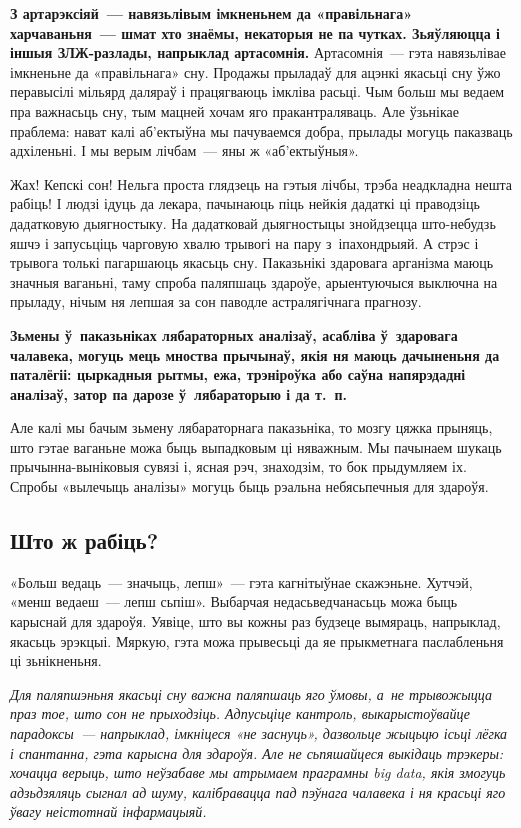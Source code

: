\textbf{З артарэксіяй~--- навязьлівым імкненьнем да «правільнага» харчаваньня~--- шмат хто знаёмы, некаторыя не па чутках. Зьяўляюцца і іншыя ЗЛЖ-разлады, напрыклад артасомнія.} Артасомнія~--- гэта навязьлівае імкненьне да «правільнага» сну. Продажы прыладаў для ацэнкі якасьці сну ўжо перавысілі мільярд даляраў і працягваюць імкліва расьці. Чым больш мы ведаем пра важнасьць сну, тым мацней хочам яго пракантраляваць. Але ўзьнікае праблема: нават калі аб'ектыўна мы пачуваемся добра, прылады могуць паказваць адхіленьні. І мы верым лічбам~--- яны ж «аб'ектыўныя».

Жах! Кепскі сон! Нельга проста глядзець на гэтыя лічбы, трэба неадкладна нешта рабіць! І людзі ідуць да лекара, пачынаюць піць нейкія дадаткі ці праводзіць дадатковую дыягностыку. На дадатковай дыягностыцы знойдзецца што-небудзь яшчэ і запусьціць чарговую хвалю трывогі на пару з~іпахондрыяй. А стрэс і трывога толькі пагаршаюць якасьць сну. Паказьнікі здаровага арганізма маюць значныя ваганьні, таму спроба паляпшаць здароўе, арыентуючыся выключна на прыладу, нічым ня лепшая за сон паводле астралягічнага прагнозу.

\textbf{Зьмены ў~паказьніках лябараторных аналізаў, асабліва ў~здаровага чалавека, могуць мець мноства прычынаў, якія ня маюць дачыненьня да паталёгіі: цыркадныя рытмы, ежа, трэніроўка або саўна напярэдадні аналізаў, затор па дарозе ў~лябараторыю і да т.~п.}

Але калі мы бачым зьмену лябараторнага паказьніка, то мозгу цяжка прыняць, што гэтае ваганьне можа быць выпадковым ці няважным. Мы пачынаем шукаць прычынна-выніковыя сувязі і, ясная рэч, знаходзім, то бок прыдумляем іх. Спробы «вылечыць аналізы» могуць быць рэальна небясьпечныя для здароўя.

\subsection*{Што ж рабіць?}

«Больш ведаць~--- значыць, лепш»~--- гэта кагнітыўнае скажэньне. Хутчэй, «менш ведаеш~--- лепш сьпіш». Выбарчая недасьведчанасьць можа быць карыснай для здароўя. Уявіце, што вы кожны раз будзеце вымяраць, напрыклад, якасьць эрэкцыі. Мяркую, гэта можа прывесьці да яе прыкметнага паслабленьня ці зьнікненьня.

\emph{Для паляпшэньня якасьці сну важна паляпшаць яго ўмовы, а~не трывожыцца праз тое, што сон не прыходзіць. Адпусьціце кантроль, выкарыстоўвайце парадоксы~--- напрыклад, імкніцеся «не заснуць», дазвольце жыцьцю ісьці лёгка і спантанна, гэта карысна для здароўя. Але не сьпяшайцеся выкідаць трэкеры: хочацца верыць, што неўзабаве мы атрымаем праграмны big data, якія змогуць адзьдзяляць сыгнал ад шуму, калібравацца пад пэўнага чалавека і ня красьці яго ўвагу неістотнай інфармацыяй.}

